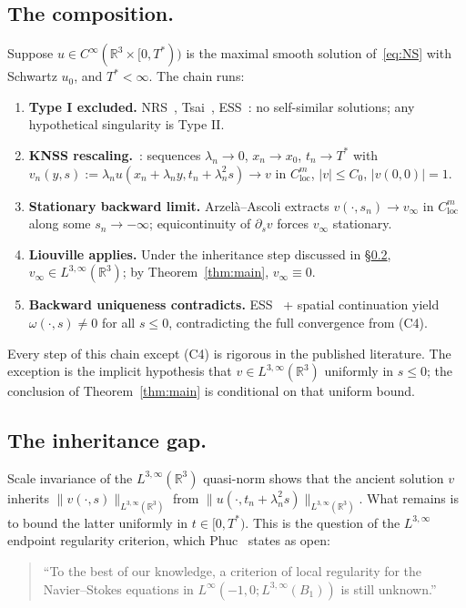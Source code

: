 \documentclass[11pt]{amsart}
\theoremstyle{definition}
\newcommand{\RR}{\mathbb{R}}
\newcommand{\Lweak}[1]{L^{3,\infty}(\RR^{#1})}
\newcommand{\norm}[1]{\|#1\|}
\newcommand{\abs}[1]{|#1|}
\newcommand{\loc}{\mathrm{loc}}
\begin{document}
\subsection{The composition.}
Suppose $u \in C^\infty(\RR^3 \times [0, T^*))$ is the maximal
smooth solution of~\eqref{eq:NS} with Schwartz $u_0$, and
$T^* < \infty$. The chain runs:
\begin{enumerate}[label=(C\arabic*),itemsep=2pt]
\item \textbf{Type I excluded.} NRS~\cite{NRS96},
Tsai~\cite{Tsai98}, ESS~\cite{ESS03RMS}: no self-similar
solutions; any hypothetical singularity is Type II.
\item \textbf{KNSS rescaling.}~\cite[\S6]{KNSS}: sequences
$\lambda_n \to 0$, $x_n \to x_0$, $t_n \to T^*$ with
$v_n(y, s) := \lambda_n u(x_n + \lambda_n y, t_n + \lambda_n^2 s)
\to v$ in $C^m_\loc$, $\abs{v} \leq C_0$,
$\abs{v(0, 0)} = 1$.
\item \textbf{Stationary backward limit.} Arzel\`a--Ascoli
extracts $v(\cdot, s_n) \to v_\infty$ in $C^m_\loc$ along some
$s_n \to -\infty$; equicontinuity of $\partial_s v$ forces
$v_\infty$ stationary.
\item \textbf{Liouville applies.} Under the inheritance step
discussed in \S\ref{ssec:inheritance}, $v_\infty \in
\Lweak{3}$; by Theorem~\ref{thm:main}, $v_\infty \equiv 0$.
\item \textbf{Backward uniqueness contradicts.}
ESS~\cite[\S5]{ESS03RMS} + spatial continuation
\cite[\S4]{ESS03RMS} yield $\omega(\cdot, s) \neq 0$ for all
$s \leq 0$, contradicting the full convergence from (C4).
\end{enumerate}

Every step of this chain except (C4) is rigorous in the
published literature. The exception is the implicit hypothesis
that $v \in \Lweak{3}$ uniformly in $s \leq 0$; the conclusion
of Theorem~\ref{thm:main} is conditional on that uniform bound.

\subsection{The inheritance gap.}\label{ssec:inheritance}

Scale invariance of the $\Lweak{3}$ quasi-norm shows that the
ancient solution $v$ inherits $\norm{v(\cdot, s)}_{\Lweak{3}}$
from $\norm{u(\cdot, t_n + \lambda_n^2 s)}_{\Lweak{3}}$. What
remains is to bound the latter uniformly in $t \in [0, T^*)$.
This is the question of the $L^{3,\infty}$ endpoint regularity
criterion, which Phuc~\cite[p.~4]{Phuc2015} states as open:
\begin{quote}
``To the best of our knowledge, a criterion of local regularity
for the Navier--Stokes equations in $L^\infty(-1, 0;
L^{3,\infty}(B_1))$ is still unknown.''
\end{quote}
\end{document}
